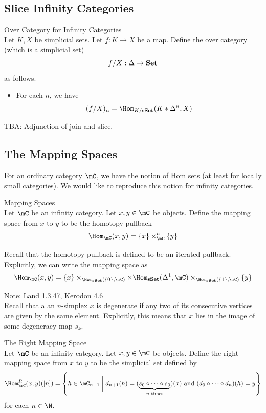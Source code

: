 \documentclass[a4paper]{article}
\begin{document}
\subsection{Slice Infinity Categories}
\begin{defn}{Over Category for Infinity Categories}{}\\ Let $K,X$ be simplicial sets. Let $f:K\to X$ be a map. Define the over category (which is a simplicial set) $$f/X:\Delta\to\bold{Set}$$ as follows. 
\begin{itemize}
\item For each $n$, we have $$(f/X)_n=\Hom_{K/\bold{sSet}}(K\ast\Delta^n,X)$$
\end{itemize}
\end{defn}

TBA: Adjunction of join and slice. \\

\subsection{The Mapping Spaces}
For an ordinary category $\mC$, we have the notion of Hom sets (at least for locally small categories). We would like to reproduce this notion for infinity categories. 

\begin{defn}{Mapping Spaces}{}\\ Let $\mC$ be an infinity category. Let $x,y\in\mC$ be objects. Define the mapping space from $x$ to $y$ to be the homotopy pullback $$\Hom_\mC(x,y)=\{x\}\times_\mC^h\{y\}$$
\end{defn}

Recall that the homotopy pullback is defined to be an iterated pullback. Explicitly, we can write the mapping space as $$\Hom_\mC(x,y)=\{x\}\times_{\Hom_\bold{sSet}(\{0\},\mC)}\times\Hom_\bold{sSet}(\Delta^1,\mC)\times_{\Hom_\bold{sSet}(\{1\},\mC)}\{y\}$$

Note: Land 1.3.47, Kerodon 4.6\\

Recall that a an $n$-simplex $x$ is degenerate if any two of its consecutive vertices are given by the same element. Explicitly, this means that $x$ lies in the image of some degeneracy map $s_k$. 

\begin{defn}{The Right Mapping Space}{}\\ Let $\mC$ be an infinity category. Let $x,y\in\mC$ be objects. Define the right mapping space from $x$ to $y$ to be the simplicial set defined by $$\Hom_\mC^R(x,y)([n])=\left\{h\in\mC_{n+1}\;\bigg{|}\;d_{n+1}(h)=(\underbrace{s_0\circ\cdots\circ s_0}_{n\text{ times}})(x)\text{ and }(d_0\circ\cdots\circ d_n)(h)=y\right\}$$ for each $n\in\N$. 
\end{defn}
\end{document}
